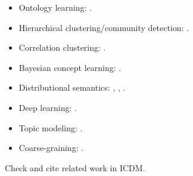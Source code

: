 \documentclass[conference]{IEEEtran}
\newcommand{\comment}[1]{{\small \color{red} {#1}} \normalcolor}
\begin{document}
\begin{itemize}
\item Ontology learning: \cite{Wong2012ontology}.
\item Hierarchical clustering/community detection: \cite{Fortunato10}.
\item Correlation clustering: \cite{MacMahon15}.
\item Bayesian concept learning: \cite{tenenbaum00}.
\item Distributional semantics:  \cite{Harispe2015}, \cite{Pennington2014}, \cite{Mikolov-2013}.
\item Deep learning: \cite{LeCun15}.
\item Topic modeling: \cite{Blei12}.
\item Coarse-graining: \cite{Saunders13}.
\end{itemize}

\comment{Check and cite related work in ICDM.}

\end{document}
